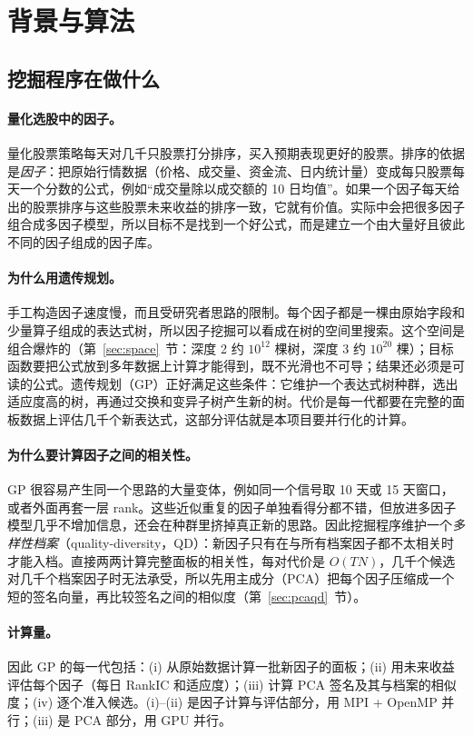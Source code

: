\documentclass[11pt,a4paper,UTF8,fontset=fandol]{ctexart}
\begin{document}
\section{背景与算法}

\subsection{挖掘程序在做什么}
\paragraph{量化选股中的因子。}量化股票策略每天对几千只股票打分排序，买入预期表现更好的股票。排序的依据是\emph{因子}：把原始行情数据（价格、成交量、资金流、日内统计量）变成每只股票每天一个分数的公式，例如“成交量除以成交额的 10 日均值”。如果一个因子每天给出的股票排序与这些股票未来收益的排序一致，它就有价值。实际中会把很多因子组合成多因子模型，所以目标不是找到一个好公式，而是建立一个由大量好且彼此不同的因子组成的因子库。

\paragraph{为什么用遗传规划。}手工构造因子速度慢，而且受研究者思路的限制。每个因子都是一棵由原始字段和少量算子组成的表达式树，所以因子挖掘可以看成在树的空间里搜索。这个空间是组合爆炸的（第~\ref{sec:space}~节：深度 2 约 $10^{12}$ 棵树，深度 3 约 $10^{20}$ 棵）；目标函数要把公式放到多年数据上计算才能得到，既不光滑也不可导；结果还必须是可读的公式。遗传规划（GP）正好满足这些条件：它维护一个表达式树种群，选出适应度高的树，再通过交换和变异子树产生新的树。代价是每一代都要在完整的面板数据上评估几千个新表达式，这部分评估就是本项目要并行化的计算。

\paragraph{为什么要计算因子之间的相关性。}GP 很容易产生同一个思路的大量变体，例如同一个信号取 10 天或 15 天窗口，或者外面再套一层 rank。这些近似重复的因子单独看得分都不错，但放进多因子模型几乎不增加信息，还会在种群里挤掉真正新的思路。因此挖掘程序维护一个\emph{多样性档案}（quality-diversity，QD）：新因子只有在与所有档案因子都不太相关时才能入档。直接两两计算完整面板的相关性，每对代价是 $O(TN)$，几千个候选对几千个档案因子时无法承受，所以先用主成分（PCA）把每个因子压缩成一个短的签名向量，再比较签名之间的相似度（第~\ref{sec:pcaqd}~节）。

\paragraph{计算量。}因此 GP 的每一代包括：(i) 从原始数据计算一批新因子的面板；(ii) 用未来收益评估每个因子（每日 RankIC 和适应度）；(iii) 计算 PCA 签名及其与档案的相似度；(iv) 逐个准入候选。(i)--(ii) 是因子计算与评估部分，用 MPI + OpenMP 并行；(iii) 是 PCA 部分，用 GPU 并行。
\end{document}
